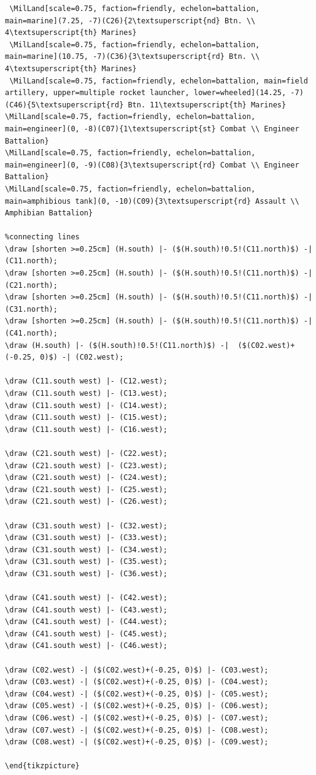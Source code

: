\documentclass[a4paper, titlepage]{article}
\newenvironment{writett}{\ttfamily}{\par}
\begin{document}
\begin{landscape}
\begin{writett}
\begin{verbatim}
 \MilLand[scale=0.75, faction=friendly, echelon=battalion, main=marine](7.25, -7)(C26){2\textsuperscript{nd} Btn. \\ 4\textsuperscript{th} Marines}
 \MilLand[scale=0.75, faction=friendly, echelon=battalion, main=marine](10.75, -7)(C36){3\textsuperscript{rd} Btn. \\ 4\textsuperscript{th} Marines}
 \MilLand[scale=0.75, faction=friendly, echelon=battalion, main=field artillery, upper=multiple rocket launcher, lower=wheeled](14.25, -7)(C46){5\textsuperscript{rd} Btn. 11\textsuperscript{th} Marines}
\MilLand[scale=0.75, faction=friendly, echelon=battalion, main=engineer](0, -8)(C07){1\textsuperscript{st} Combat \\ Engineer Battalion}
\MilLand[scale=0.75, faction=friendly, echelon=battalion, main=engineer](0, -9)(C08){3\textsuperscript{rd} Combat \\ Engineer Battalion}
\MilLand[scale=0.75, faction=friendly, echelon=battalion, main=amphibious tank](0, -10)(C09){3\textsuperscript{rd} Assault \\ Amphibian Battalion}

%connecting lines
\draw [shorten >=0.25cm] (H.south) |- ($(H.south)!0.5!(C11.north)$) -| (C11.north);
\draw [shorten >=0.25cm] (H.south) |- ($(H.south)!0.5!(C11.north)$) -| (C21.north);
\draw [shorten >=0.25cm] (H.south) |- ($(H.south)!0.5!(C11.north)$) -| (C31.north);
\draw [shorten >=0.25cm] (H.south) |- ($(H.south)!0.5!(C11.north)$) -| (C41.north);
\draw (H.south) |- ($(H.south)!0.5!(C11.north)$) -|  ($(C02.west)+(-0.25, 0)$) -| (C02.west);

\draw (C11.south west) |- (C12.west);
\draw (C11.south west) |- (C13.west);
\draw (C11.south west) |- (C14.west);
\draw (C11.south west) |- (C15.west);
\draw (C11.south west) |- (C16.west);

\draw (C21.south west) |- (C22.west);
\draw (C21.south west) |- (C23.west);
\draw (C21.south west) |- (C24.west);
\draw (C21.south west) |- (C25.west);
\draw (C21.south west) |- (C26.west);

\draw (C31.south west) |- (C32.west);
\draw (C31.south west) |- (C33.west);
\draw (C31.south west) |- (C34.west);
\draw (C31.south west) |- (C35.west);
\draw (C31.south west) |- (C36.west);

\draw (C41.south west) |- (C42.west);
\draw (C41.south west) |- (C43.west);
\draw (C41.south west) |- (C44.west);
\draw (C41.south west) |- (C45.west);
\draw (C41.south west) |- (C46.west);

\draw (C02.west) -| ($(C02.west)+(-0.25, 0)$) |- (C03.west);
\draw (C03.west) -| ($(C02.west)+(-0.25, 0)$) |- (C04.west);
\draw (C04.west) -| ($(C02.west)+(-0.25, 0)$) |- (C05.west);
\draw (C05.west) -| ($(C02.west)+(-0.25, 0)$) |- (C06.west);
\draw (C06.west) -| ($(C02.west)+(-0.25, 0)$) |- (C07.west);
\draw (C07.west) -| ($(C02.west)+(-0.25, 0)$) |- (C08.west);
\draw (C08.west) -| ($(C02.west)+(-0.25, 0)$) |- (C09.west);

\end{tikzpicture}
\end{verbatim}
\end{writett}

\end{landscape}
\end{document}
